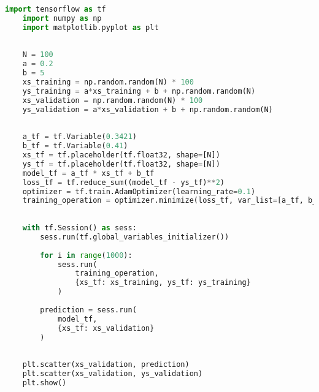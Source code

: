 \begin{lstlisting}[language=python]
    import tensorflow as tf
    import numpy as np
    import matplotlib.pyplot as plt
    
    
    N = 100
    a = 0.2
    b = 5
    xs_training = np.random.random(N) * 100
    ys_training = a*xs_training + b + np.random.random(N)
    xs_validation = np.random.random(N) * 100
    ys_validation = a*xs_validation + b + np.random.random(N)
    
    
    a_tf = tf.Variable(0.3421)
    b_tf = tf.Variable(0.41)
    xs_tf = tf.placeholder(tf.float32, shape=[N])
    ys_tf = tf.placeholder(tf.float32, shape=[N])
    model_tf = a_tf * xs_tf + b_tf
    loss_tf = tf.reduce_sum((model_tf - ys_tf)**2)
    optimizer = tf.train.AdamOptimizer(learning_rate=0.1)
    training_operation = optimizer.minimize(loss_tf, var_list=[a_tf, b_tf])
    
    
    with tf.Session() as sess:
        sess.run(tf.global_variables_initializer())
    
        for i in range(1000):
            sess.run(
                training_operation, 
                {xs_tf: xs_training, ys_tf: ys_training}
            )
    
        prediction = sess.run(
            model_tf, 
            {xs_tf: xs_validation}
        )
    
    
    plt.scatter(xs_validation, prediction)
    plt.scatter(xs_validation, ys_validation)
    plt.show()

\end{lstlisting}
